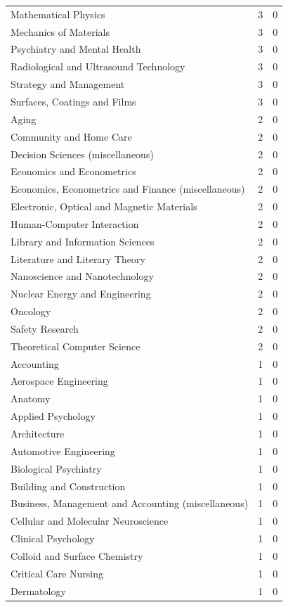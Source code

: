 \documentclass[12pt,brazil]{article}\usepackage[]{graphicx}\usepackage[]{xcolor}
\begin{document}
\begin{longtable}{lrr}
Mathematical Physics & 3 & 0 \\
Mechanics of Materials & 3 & 0 \\
Psychiatry and Mental Health & 3 & 0 \\
Radiological and Ultrasound Technology & 3 & 0 \\
Strategy and Management & 3 & 0 \\
Surfaces, Coatings and Films & 3 & 0 \\
Aging & 2 & 0 \\
Community and Home Care & 2 & 0 \\
Decision Sciences (miscellaneous) & 2 & 0 \\
Economics and Econometrics & 2 & 0 \\
Economics, Econometrics and Finance (miscellaneous) & 2 & 0 \\
Electronic, Optical and Magnetic Materials & 2 & 0 \\
Human-Computer Interaction & 2 & 0 \\
Library and Information Sciences & 2 & 0 \\
Literature and Literary Theory & 2 & 0 \\
Nanoscience and Nanotechnology & 2 & 0 \\
Nuclear Energy and Engineering & 2 & 0 \\
Oncology & 2 & 0 \\
Safety Research & 2 & 0 \\
Theoretical Computer Science & 2 & 0 \\
Accounting & 1 & 0 \\
Aerospace Engineering & 1 & 0 \\
Anatomy & 1 & 0 \\
Applied Psychology & 1 & 0 \\
Architecture & 1 & 0 \\
Automotive Engineering & 1 & 0 \\
Biological Psychiatry & 1 & 0 \\
Building and Construction & 1 & 0 \\
Business, Management and Accounting (miscellaneous) & 1 & 0 \\
Cellular and Molecular Neuroscience & 1 & 0 \\
Clinical Psychology & 1 & 0 \\
Colloid and Surface Chemistry & 1 & 0 \\
Critical Care Nursing & 1 & 0 \\
Dermatology & 1 & 0 \\

\end{longtable}
\end{document}

